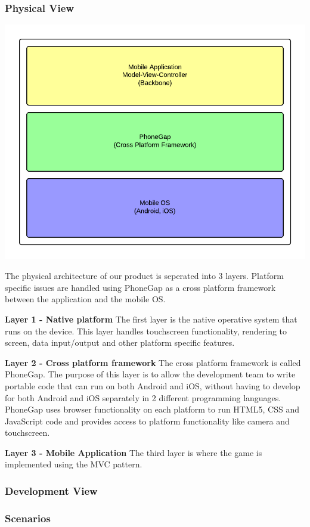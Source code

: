 \subsubsection{Physical View} %
\includegraphics{pictures/physical_view}

The physical architecture of our product is seperated into 3 layers. Platform specific issues are handled using PhoneGap as a cross platform framework between the application and the mobile OS.

{\bf Layer 1 - Native platform}
The first layer is the native operative system that runs on the device. This layer handles touchscreen functionality, rendering to screen, data input/output and other platform specific features.

{\bf Layer 2 - Cross platform framework}
The cross platform framework is called PhoneGap. The purpose of this layer is to allow the development team to write portable code that can run on both Android and iOS, without having to develop for both Android and iOS separately in 2 different programming languages. PhoneGap uses browser functionality on each platform to run HTML5, CSS and JavaScript code and provides access to platform functionality like camera and touchscreen.

{\bf Layer 3 - Mobile Application}
The third layer is where the game is implemented using the MVC pattern. 


\subsubsection{Development View} %

\subsubsection{Scenarios} %
